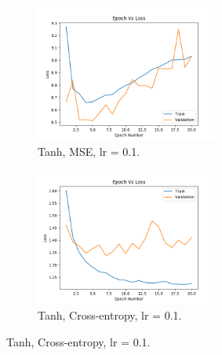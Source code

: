 \documentclass[12pt]{article}
\begin{document}
			\begin{figure}
				\centering
				\begin{framed}
				\begin{subfigure}{5.5cm}
					\centering
					\includegraphics[width=6cm]{../Images/Epoch_VS_Loss/Tanh_MSE_01.png}
					\captionsetup{justification=centering,margin=1cm}
					\caption{Tanh, MSE, lr = 0.1.}
					\label{fig:sub7}
				\end{subfigure}
				\begin{subfigure}{5.5cm}
					\centering
					\includegraphics[width=6cm]{../Images/Epoch_VS_Loss/Tanh_cross-entropy_01.png}
					\captionsetup{justification=centering,margin=.8cm}
					\caption{Tanh, Cross-entropy, lr = 0.1.}
					\label{fig:sub8}
				\end{subfigure}
			

\end{framed}
\end{figure}
\end{document}
